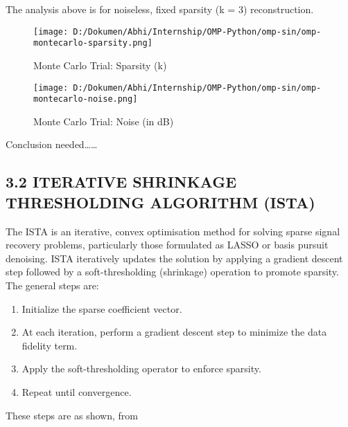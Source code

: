 \documentclass[
  letterpaper,
  DIV=11,
  numbers=noendperiod]{scrartcl}
\providecommand{\tightlist}{%
  \setlength{\itemsep}{0pt}\setlength{\parskip}{0pt}}
\begin{document}
The analysis above is for noiseless, fixed sparsity (k = 3)
reconstruction.

\begin{figure}[H]

{\centering \texttt{[image: D:/Dokumen/Abhi/Internship/OMP-Python/omp-sin/omp-montecarlo-sparsity.png]}

}

\caption{Monte Carlo Trial: Sparsity (k)}

\end{figure}%

\begin{figure}[H]

{\centering \texttt{[image: D:/Dokumen/Abhi/Internship/OMP-Python/omp-sin/omp-montecarlo-noise.png]}

}

\caption{Monte Carlo Trial: Noise (in dB)}

\end{figure}%

Conclusion needed\ldots\ldots{}

\subsection{3.2 ITERATIVE SHRINKAGE THRESHOLDING ALGORITHM
(ISTA)}\label{iterative-shrinkage-thresholding-algorithm-ista}

The ISTA is an iterative, convex optimisation method for solving sparse
signal recovery problems, particularly those formulated as LASSO or
basis pursuit denoising. ISTA iteratively updates the solution by
applying a gradient descent step followed by a soft-thresholding
(shrinkage) operation to promote sparsity. The general steps are:

\begin{enumerate}
\def\labelenumi{\arabic{enumi}.}
\tightlist
\item
  Initialize the sparse coefficient vector.
\item
  At each iteration, perform a gradient descent step to minimize the
  data fidelity term.
\item
  Apply the soft-thresholding operator to enforce sparsity.
\item
  Repeat until convergence.
\end{enumerate}

These steps are as shown, from \autocite{fast-sparse-coding}
\end{document}
